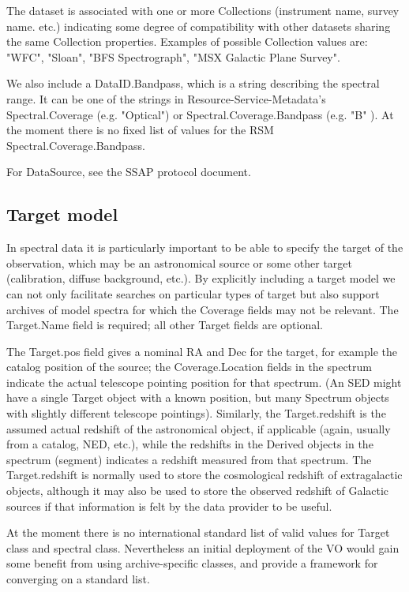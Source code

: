 \documentclass[11pt]{article}
\begin{document}
The dataset is associated with one or more Collections (instrument
name, survey name. etc.) indicating some degree of compatibility with other
datasets sharing the same Collection properties. Examples of possible
Collection values are: "WFC", "Sloan", "BFS Spectrograph", "MSX
Galactic Plane Survey".

We also include a DataID.Bandpass, which is a string describing the
spectral range. It can be one of the strings in Resource-Service-Metadata's
Spectral.Coverage (e.g. "Optical") or Spectral.Coverage.Bandpass (e.g. "B" ).
At the moment there is no fixed list of values for the RSM
Spectral.Coverage.Bandpass.


For DataSource, see the SSAP protocol document.

\subsection{Target model}


In spectral data it is particularly important to be able to
specify the target of the observation, which may be an astronomical
source or some other target (calibration, diffuse background, etc.).
By explicitly including a target model we
can not only facilitate searches on particular types of target
but also support archives of model spectra for which the Coverage
fields may not be relevant.
The Target.Name field is required; all other Target fields are optional. 


The Target.pos field
gives a nominal RA and Dec for the target, for example the catalog
position of the source; the Coverage.Location fields in the
spectrum  indicate the actual telescope pointing position for that
spectrum. (An SED might have a single Target object with a known
position, but many
Spectrum objects with slightly different telescope pointings).
Similarly, the Target.redshift is the assumed actual
redshift of the  astronomical object, if applicable (again,
usually from a catalog, NED, etc.), while the redshifts in the
Derived objects in the spectrum (segment) indicates a redshift measured from
that spectrum. The Target.redshift is normally used to store the
cosmological redshift of extragalactic objects, although it may
also be used to store the observed redshift of Galactic sources if that
information is felt by the data provider to be useful.

At the moment there is no international standard list of
valid values for Target class and spectral class. Nevertheless
an initial deployment of the VO would gain some benefit from
using archive-specific classes, and provide a framework for
converging on a standard list.
\end{document}
